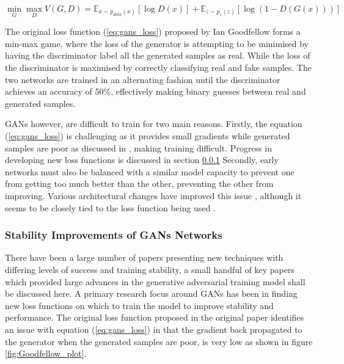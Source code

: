 \documentclass[12pt]{article}
\begin{document}
\begin{equation} \label{eq:gans_loss}
    \min_{G} \max_{D} V(G, D) = \mathbb{E}_{x \sim p_{data}(x)} [\log D(x)]
                              + \mathbb{E}_{z \sim p_{z}(z)} [\log (1 - D(G(x)))]
\end{equation}

\noindent The original loss function (\ref{eq:gans_loss}) proposed by Ian Goodfellow forms a min-max game, where the loss of the generator is attempting to be minimised by having the discriminator label all the generated samples as real.
While the loss of the discriminator is maximised by correctly classifying real and fake samples.
The two networks are trained in an alternating fashion until the discriminator achieves an accuracy of 50\%, effectively making binary guesses between real and generated samples.

GANs however, are difficult to train for two main reasons.
Firstly, the equation (\ref{eq:gans_loss}) is challenging as it provides small gradients while generated samples are poor as discussed in \cite{Goodfellow2014}, making training difficult.
Progress in developing new loss functions is discussed in section \ref{Stability_to_GANs}
Secondly, early networks must also be balanced with a similar model capacity to prevent one from getting too much better than the other, preventing the other from improving.
Various architectural changes have improved this issue \cite{Radford2016, Zhang2018}, although it seems to be closely tied to the loss function being used \cite{Gulrajani2017}.

\subsubsection{Stability Improvements of GANs Networks} \label{Stability_to_GANs}
There have been a large number of papers presenting new techniques with differing levels of success and training stability, a small handful of key papers which provided large advances in the generative adversarial training model shall be discussed here.
A primary research focus around GANs has been in finding new loss functions on which to train the model to improve stability and performance.
The original loss function proposed in the original paper \cite{Goodfellow2014} identifies an issue with equation (\ref{eq:gans_loss}) in that the gradient back propagated to the generator when the generated samples are poor, is very low as shown in figure \ref{fig:Goodfellow_plot}.
\end{document}
